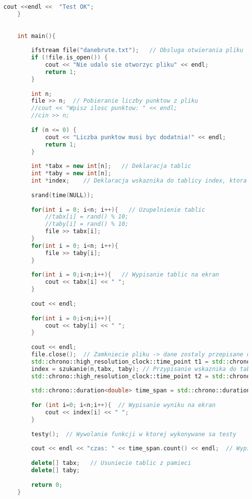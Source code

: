 \documentclass[12pt,twoside]{article}
\begin{document}
\begin{lstlisting}[language=C++,caption=Kod BruteForce,label={bruteforcekod}]
        cout <<endl <<  "Test OK";
    }
    
    
    int main(){
        
        ifstream file("danebrute.txt");   // Obsluga otwierania pliku
        if (!file.is_open()) {
            cout << "Nie udalo sie otworzyc pliku" << endl;
            return 1;
        }
        
        int n;
        file >> n;  // Pobieranie liczby punktow z pliku
        //cout << "Wpisz ilosc punktow: " << endl;
        //cin >> n;
        
        if (n <= 0) {
            cout << "Liczba punktow musi byc dodatnia!" << endl;
            return 1;
        }
        
        int *tabx = new int[n];   // Deklaracja tablic
        int *taby = new int[n];
        int *index;    // Deklaracja wskaznika do tablicy index, ktora jest stworzona w funkcji
        
        srand(time(NULL));
        
        for(int i = 0; i<n; i++){   // Uzupelnienie tablic
            //tabx[i] = rand() % 10;
            //taby[i] = rand() % 10;
            file >> tabx[i];
        }
        for(int i = 0; i<n; i++){
            file >> taby[i];
        }
        
        for(int i = 0;i<n;i++){   // Wypisanie tablic na ekran
            cout << tabx[i] << " ";
        }
        
        cout << endl;
        
        for(int i = 0;i<n;i++){
            cout << taby[i] << " ";
        }
        
        cout << endl;
        file.close();  // Zamkniecie pliku -> dane zostaly przepisane do tablic
        std::chrono::high_resolution_clock::time_point t1 = std::chrono::high_resolution_clock::now();
        index = szukanie(n,tabx, taby);	// Przypisanie wskaznika do tablicy "zwrotnej" z funkcji szukanie
        std::chrono::high_resolution_clock::time_point t2 = std::chrono::high_resolution_clock::now();
        
        std::chrono::duration<double> time_span = std::chrono::duration_cast<std::chrono::duration<double>>(t2 - t1);
        
        for (int i=0; i<n;i++){  // Wypisanie wyniku na ekran
            cout << index[i] << " ";
        }
        
        testy();  // Wywolanie funkcji w ktorej wykonywane sa testy
        
        cout << endl << "czas: " << time_span.count() << endl;  // Wypisanie pomiaru czasu
        
        delete[] tabx;   // Usuniecie tablic z pamieci
        delete[] taby;
        
        return 0;
    }
\end{lstlisting}
\end{document}
